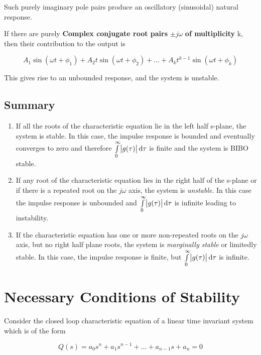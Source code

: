 \documentclass[
  14pt,
  a4paper,
  oneside,
  open=any,
  a4paper,
  14pt]{report}
\begin{document}
Such purely imaginary pole pairs produce an oscillatory (sinusoidal)
natural response.

If there are purely \textbf{Complex conjugate root pairs}
\(\pm j\omega\) \textbf{of multiplicity} k, then their contribution to
the output is

\[
    A_1 \sin(\omega t + \phi_1) + A_2 t \sin(\omega t + \phi_2) + \ldots + A_k t^{k-1} \sin(\omega t + \phi_k)
\]

This gives rise to an unbounded response, and the system is unstable.

\subsection{Summary}\label{summary}

\begin{enumerate}
\def\labelenumi{\arabic{enumi}.}
\item
  If all the roots of the characteristic equation lie in the left half
  s-plane, the system is stable. In this case, the impulse response is
  bounded and eventually converges to zero and therefore
  \(\int\limits_{0}^{\infty} \abs{g(\tau)} \odif{\tau}\) is finite and
  the system is BIBO stable.
\item
  If any root of the characteristic equation lies in the right half of
  the s-plane or if there is a repeated root on the \(j\omega\) axis,
  the system is \emph{unstable}. In this case the impulse response is
  unbounded and \(\int\limits_{0}^{\infty} \abs{g(\tau)} \odif{\tau}\)
  is infinite leading to instability.
\item
  If the characteristic equation has one or more non-repeated roots on
  the \(j\omega\) axis, but no right half plane roots, the system is
  \emph{marginally stable} or limitedly stable. In this case, the
  impulse response is finite, but
  \(\int\limits_{0}^{\infty} \abs{g(\tau)} \odif{\tau}\) is infinite.
\end{enumerate}

\section{Necessary Conditions of
Stability}\label{necessary-conditions-of-stability}

Consider the closed loop characteristic equation of a linear time
invariant system which is of the form

\[
    Q(s) = a_0 s^n + a_1 s^{n-1} + \ldots + a_{n-1}s + a_n = 0
\]
\end{document}
